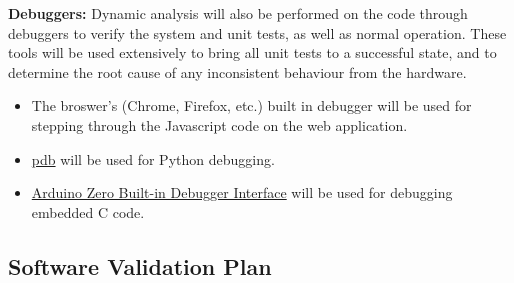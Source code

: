 \documentclass[12pt, titlepage]{article}
\begin{document}
\textbf{Debuggers:} Dynamic analysis will also be performed on the code through debuggers to verify the system and unit tests, as well as normal operation. These tools will be used extensively to bring all unit tests to a successful state, and to determine the root cause of any inconsistent behaviour from the hardware.
  \begin{itemize}
    \item The broswer's (Chrome, Firefox, etc.) built in debugger will be used for stepping through the Javascript code on the web application.
    \item \href{https://docs.python.org/3/library/pdb.html}{pdb} will be used for Python debugging.
    \item \href{https://docs.arduino.cc/tutorials/zero/debugging-with-zero}{Arduino Zero Built-in Debugger Interface} will be used for debugging embedded C code.
  \end{itemize}







\subsection{Software Validation Plan}
\end{document}
